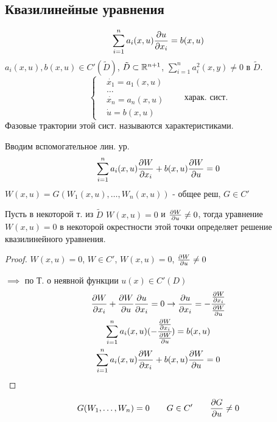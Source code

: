 \documentclass{article}
\begin{document}
\subsection{Квазилинейные уравнения}
\[
  \sum_{i=1}^{n}a_i(x,u)\frac{\partial{u}}{\partial{x_i}}=b(x,u)
\]
$a_i(x,u),b(x,u)\in C'(\tilde{D})$, $\tilde{D}\subset \mathbb{R}^{n+1}$,
$\sum_{i=1}^{n}a_i^{2}(x,y)\neq 0$ в $\tilde{D}$.
\[
  \left\{\begin{aligned}
    & \dot{x_1}=a_1(x,u) \\ 
    & \dots  \\
    & \dot{x_n}=a_n(x,u) \\ 
    & \dot{u}=b(x,u)
  \end{aligned}\right. \qquad \text{харак. сист.}
\]
Фазовые трактории этой сист. называются характеристиками.

Вводим вспомогательное лин. ур.
\[
  \sum_{i=1}^{n}a_i(x,u)\frac{\partial{W}}{\partial{x_i}}+b(x,u)\frac{\partial{W}}{\partial{u}}=0
\]
$W(x,u)=G(W_1(x,u),\dots ,W_n(x,u))$ - общее реш, $G\in C'$
\begin{theorem}
  Пусть в некоторой т. из $\tilde{D}$ $W(x,u)=0$ и $\frac{\partial{W}}{\partial{u}}\neq 0$,
  тогда уравнение $W(x,u) =0$ в некоторой окрестности этой точки
  определяет решение квазилинейного уравнения.
\end{theorem}
\begin{proof}
  $W(x,u)=0$, $W\in C'$, $W(x,u)=0$, $\frac{\partial{W}}{\partial{u}}\neq0$

  $\implies$ по Т. о неявной функции $u(x)\in C'(D)$
  \begin{gather*}
    \frac{\partial{W}}{\partial{x_i}}+\frac{\partial{W}}{\partial{u}}\frac{\partial{u}}{\partial{x_i}}=0 \rightarrow \frac{\partial{u}}{\partial{x_i}}=-\cfrac{\frac{\partial{W}}{\partial{x_i}}}{\frac{\partial{W}}{\partial{u}}}\\ 
    \sum_{i=1}^{n}a_i(x,u)(-\cfrac{\frac{\partial{W}}{\partial{x_i}}}{\frac{\partial{W}}{\partial{u}}})=b(x,u) \\ 
    \sum_{i=1}^{n}a_i(x,u)\frac{\partial{W}}{\partial{x_i}}+b(x,u)\frac{\partial{W}}{\partial{u}}=0
  \end{gather*}
\end{proof}
\begin{definition}
  \[
  G(W_1,\dots ,W_{n})=0 \qquad G\in C' \qquad \frac{\partial{G}}{\partial{u}}\neq 0
\]
\end{definition}
\end{document}
